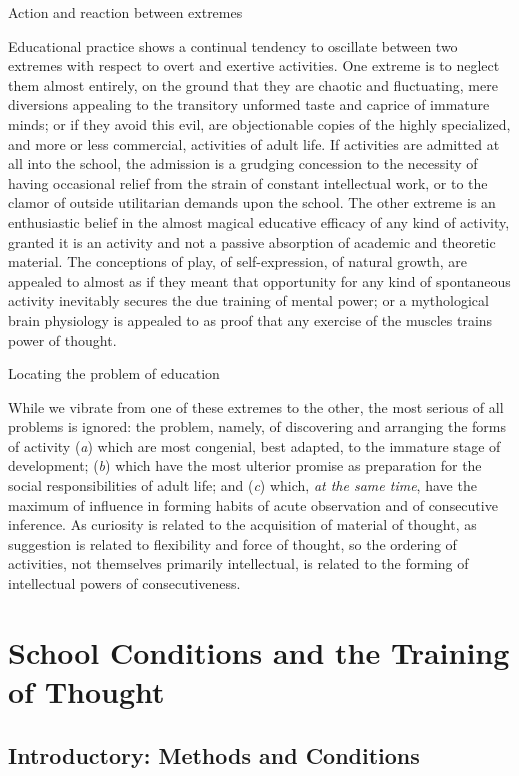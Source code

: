 \documentclass[letterpaper]{book}
\begin{document}
Action and reaction between extremes

Educational practice shows a continual tendency to oscillate between two
extremes with respect to overt and exertive activities. One extreme is
to neglect them almost entirely, on the ground that they are chaotic and
fluctuating, mere diversions appealing to the transitory unformed taste
and caprice of immature minds; or if they avoid this evil, are
objectionable copies of the highly specialized, and more or less
commercial, activities of adult life. If activities are admitted at all
into the school, the admission is a grudging concession to the necessity
of having occasional relief from the strain of constant intellectual
work, or to the clamor of outside utilitarian demands upon the school.
The other extreme is an enthusiastic belief in the almost magical
educative efficacy of any kind of activity, granted it is an activity
and not a passive absorption of academic and theoretic material. The
conceptions of play,
of
self-expression, of natural growth, are appealed to almost as if they
meant that opportunity for any kind of spontaneous activity inevitably
secures the due training of mental power; or a mythological brain
physiology is appealed to as proof that any exercise of the muscles
trains power of thought.

Locating the problem of education

While we vibrate from one of these extremes to the other, the most
serious of all problems is ignored: the problem, namely, of discovering
and arranging the forms of activity (\emph{a}) which are most congenial,
best adapted, to the immature stage of development; (\emph{b}) which
have the most ulterior promise as preparation for the social
responsibilities of adult life; and (\emph{c}) which, \emph{at the same
time}, have the maximum of influence in forming habits of acute
observation and of consecutive inference. As curiosity is related to the
acquisition of material of thought, as suggestion is related to
flexibility and force of thought, so the ordering of activities, not
themselves primarily intellectual, is related to the forming of
intellectual powers of
consecutiveness.

\chapter{School Conditions and the Training of Thought}

\section{Introductory: Methods and Conditions}
\end{document}
